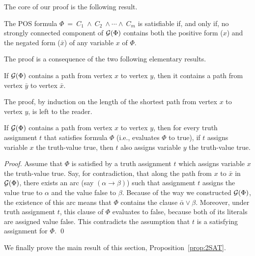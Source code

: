 The core of our proof is the following result.

\begin{prop}
\label{prop:2SAT}
The POS formula $\Phi \ = \ C_1 \ \wedge \ C_2 \ \wedge \cdots \wedge
\ C_m$ is satisfiable if, and only if, no strongly connected component
of $\mbox{$\cal G$}(\Phi)$ contains both the positive form ($x$) and the negated
form ($\bar{x}$) of any variable $x$ of $\Phi$.
\end{prop}

The proof is a consequence of the two following elementary results.

\begin{lemma}
\label{lem:2SATlemma1}
If $\mbox{$\cal G$}(\Phi)$ contains a path from vertex $x$ to vertex $y$, then it
contains a path from vertex $\bar{y}$ to vertex $\bar{x}$.
\end{lemma}

The proof, by induction on the length of the shortest path from vertex
$x$ to vertex $y$, is left to the reader. 

\begin{lemma}
\label{lem:2SATlemma2}
If $\mbox{$\cal G$}(\Phi)$ contains a path from vertex $x$ to vertex $y$, then for
every truth assignment $t$ that satisfies formula $\Phi$ (i.e.,
evaluates $\Phi$ to {\sc true}), if $t$ assigns variable $x$ the
truth-value {\sc true}, then $t$ also assigns variable $y$ the
truth-value {\sc true}.
\end{lemma}

\begin{proof}
Assume that $\Phi$ is satisfied by a truth assignment $t$ which
assigns variable $x$ the truth-value {\sc true}.  Say, for
contradiction, that along the path from $x$ to $\bar{x}$ in
$\mbox{$\cal G$}(\Phi)$, there exists an arc (say $(\alpha \rightarrow\beta)$) such
that assignment $t$ assigns the value {\sc true} to $\alpha$ and the
value {\sc false} to $\beta$.  Because of the way we constructed
$\mbox{$\cal G$}(\Phi)$, the existence of this arc means that $\Phi$ contains the
clause $\bar{\alpha} \vee \beta$.  Moreover, under truth assignment
$t$, this clause of $\Phi$ evaluates to {\sc false}, because both of
its literals are assigned value {\sc false}.  This contradicts the
assumption that $t$ is a satisfying assignment for $\Phi$.  \qed
\end{proof}

We finally prove the main result of this section,
Proposition~\ref{prop:2SAT}.

